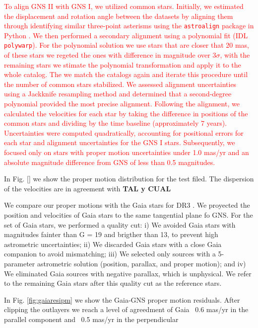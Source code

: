 \documentclass{aa} %
\begin{document}
	 \textcolor{red}{To align GNS II with GNS I, we utilized common stars. Initially, we estimated the displacement and rotation angle between the datasets by aligning them through identifying similar three-point asterisms using the \texttt{astroalign} package in Python \cite{Astroalign}. We then performed a secondary alignment using a polynomial fit (IDL \texttt{polywarp}). For the polynomial solution we use stars that are closer that 20 mas, of these stars we regeted the ones with difference in magnitude over 3$\sigma$, with the remaining stars we stimate the polynomial transformation and apply it to the whole catalog. The we match the catalogs again and iterate this procedure  until the number of common stars stabilized. We assessed alignment uncertainties using a Jackknife resampling method and determined that a second-degree polynomial provided the most precise alignment.
	 	Following the alignment, we calculated the velocities for each star by taking the difference in positions of the common stars and dividing by the time baseline (approximately 7 years). Uncertainties were computed quadratically, accounting for positional errors for each star and alignment uncertainties for the GNS I stars. Subsequently, we focused only on stars with proper motion uncertainties under 1.0 mas/yr and an absolute magnitude difference from GNS of less than 0.5 magnitudes.}
	 
	 In Fig. \ref{} we show the proper motion distribution for the test filed. The dispersion of the velocities are in agreement with \textbf{TAL y CUAL}
	
	We compare our proper motions with the Gaia stars for DR3 \citep{GDR3}. We proyected the position and velocities of Gaia stars to the same tangential plane fo GNS. For the set of Gaia stars, we performed a quality cut: i) We avoided Gaia stars with magnitudes fainter than G = 19 and brigther than 13, to prevent high astrometric uncertainties; ii) We discarded Gaia stars with a close Gaia companion to avoid mismatching; iii) We selected only sources with a 5-parameter astrometric solution (position, parallax, and proper motion); and iv) We eliminated Gaia sources with negative parallax, which is unphysical. We refer to the remaining Gaia stars after this quality cut as the reference stars. 
	
	In Fig. \ref{fig:gaiaresipm} we show the Gaia-GNS proper motion residuals. After clipping the outlayers we reach a level of agreedment of Gaia ~0.6 mas/yr in the parallel component and   ~0.5 mas/yr in the perpendicular
	 
\end{document}
